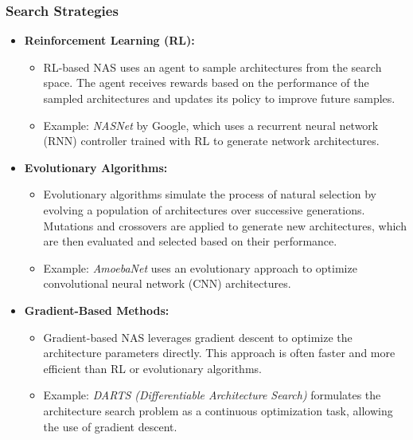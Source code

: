 \documentclass[12pt]{article}
\begin{document}
\subsubsection{Search Strategies}
\begin{itemize}
    \item \textbf{Reinforcement Learning (RL):}
    \begin{itemize}
        \item RL-based NAS uses an agent to sample architectures from the search space. The agent receives rewards based on the performance of the sampled architectures and updates its policy to improve future samples.
        \item Example: \textit{NASNet} by Google, which uses a recurrent neural network (RNN) controller trained with RL to generate network architectures.
    \end{itemize}
    \item \textbf{Evolutionary Algorithms:}
    \begin{itemize}
        \item Evolutionary algorithms simulate the process of natural selection by evolving a population of architectures over successive generations. Mutations and crossovers are applied to generate new architectures, which are then evaluated and selected based on their performance.
        \item Example: \textit{AmoebaNet} uses an evolutionary approach to optimize convolutional neural network (CNN) architectures.
    \end{itemize}
    \item \textbf{Gradient-Based Methods:}
    \begin{itemize}
        \item Gradient-based NAS leverages gradient descent to optimize the architecture parameters directly. This approach is often faster and more efficient than RL or evolutionary algorithms.
        \item Example: \textit{DARTS (Differentiable Architecture Search)} formulates the architecture search problem as a continuous optimization task, allowing the use of gradient descent.
    \end{itemize}
\end{itemize}
\end{document}
